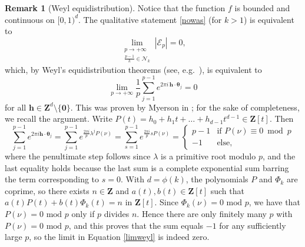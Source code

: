 \documentclass[12pt,reqno]{amsart}
\theoremstyle{definition}
\theoremstyle{plain}
\theoremstyle{definition}
\newtheorem{remark}[theorem]{Remark}
\newcommand{\Z}{\mathbf{Z}}
\newcommand\h{\mathbf{h}}
\newcommand\NN{{\mathcal N}}
\newcommand\vtheta{\boldsymbol{\theta}}
\newcommand{\err}{\mathcal{E}}
\begin{document}
\begin{remark}[Weyl equidistribution] \label{weyl} Notice that the function $f$ is bounded and continuous on $[0,1)^d$. The qualitative statement \eqref{nowas} (for $k>1$) is equivalent to
\begin{equation} 
\label{eq:lim} 
\lim_{\substack{p \rightarrow + \infty \\ \frac{p-1}{k} \in \NN_{k}}} \left|\err_p \right| = 0,
\end{equation} 
which, by Weyl's equidistribution theorems (see, e.g.\ \cite[Ch.\ 1, \S 6]{KuipersNiederreiter}), is equivalent to 
\begin{equation} 
\label{limweyl} 
\lim_{p \rightarrow +\infty} \frac{1}{p} \sum_{j=1}^{p-1} e^{2 \pi i\, \mathbf{h} \cdot \vtheta_j}  = 0 
\end{equation} 
for all $\mathbf{h} \in \Z^d \setminus \{\mathbf{0}\}$. This was proven by Myerson in \cite[Theorem 12]{Myerson}; for the sake of completeness, we recall the argument. 
Write $P(t)=h_0 + h_1 t + \dots + h_{d-1} t^{d-1} \in \Z[t]$. Then
\begin{equation*}
 \sum_{j=1}^{p-1}  e^{2\pi i \h \cdot \vtheta_j} = \sum_{j=1}^{p-1} e^{\frac{2 \pi i}{p} \lambda^j P(\nu)} = \sum_{s=1}^{p-1}  e^{\frac{2\pi i}{p} s P(\nu)} = 
\begin{cases}
p-1 & \text{if } P(\nu) \equiv 0 \bmod{p} \\ 
-1 & \text{else,}
\end{cases}
\end{equation*}
where the penultimate step follows 
since $\lambda$ is a primitive root modulo $p$, and the last equality holds because the last sum is a complete exponential sum barring the term corresponding to $s=0$.
With $d=\phi(k)$, the polynomials $P$ and $\Phi_k$ are coprime, so there exists $n \in \Z$ and $a(t), b(t) \in \Z[t]$ such that  $a(t)P(t)+b(t)\Phi_k(t) = n$ in $\Z[t]$. Since $\Phi_k(\nu)=0 \mbox{ mod } p$, we have that $P(\nu)=0 \mbox{ mod } p$ only if $p$ divides $n$. Hence there are only finitely many $p$ with $P(\nu)=0 \mbox{ mod } p$, and this proves that the sum equals $-1$ for any sufficiently large $p$, so the limit in Equation \eqref{limweyl} is indeed zero. 
 \end{remark} 
\end{document}
